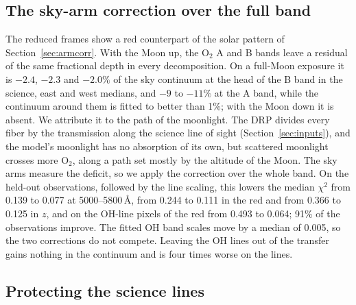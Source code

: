 \subsection{The sky-arm correction over the full band}
\label{sec:fullband}

The reduced frames show a red counterpart of the solar pattern of
Section~\ref{sec:armcorr}. With the Moon up, the O$_2$ A and B bands leave
a residual of the same fractional depth in every decomposition. On a
full-Moon exposure it is $-2.4$, $-2.3$ and $-2.0\%$ of the sky continuum at
the head of the B band in the science, east and west medians, and $-9$ to
$-11\%$ at the A band, while the continuum around them is fitted to better
than 1\%; with the Moon down it is absent. We attribute it to the path of the
moonlight. The DRP divides every fiber by the transmission along the
science line of sight (Section~\ref{sec:inputs}), and the model's moonlight
has no absorption of its own, but scattered moonlight crosses more O$_2$,
along a path set mostly by the altitude of the Moon. The sky arms measure
the deficit, so we apply the correction over the whole band. On the held-out
observations, followed by the line scaling, this lowers the median $\chi^2$
from 0.139 to 0.077 at 5000--5800\,\AA, from 0.244 to 0.111 in the red and
from 0.366 to 0.125 in $z$, and on the OH-line pixels of the red from 0.493
to 0.064; 91\% of the observations improve. The fitted OH band scales move
by a median of 0.005, so the two corrections do not compete. Leaving the OH
lines out of the transfer gains nothing in the continuum and is four times
worse on the lines.

\subsection{Protecting the science lines}
\label{sec:lineprotect}

